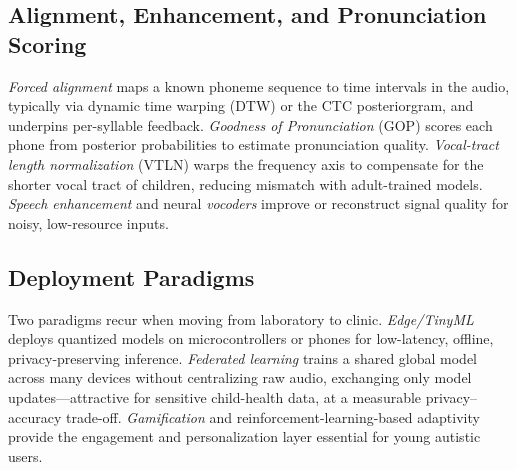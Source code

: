 \documentclass[conference]{IEEEtran}
\begin{document}
\subsection{Alignment, Enhancement, and Pronunciation Scoring}
\emph{Forced alignment} maps a known phoneme sequence to time intervals in the audio, typically via dynamic time warping (DTW) or the CTC posteriorgram, and underpins per-syllable feedback. \emph{Goodness of Pronunciation} (GOP) scores each phone from posterior probabilities to estimate pronunciation quality. \emph{Vocal-tract length normalization} (VTLN) warps the frequency axis to compensate for the shorter vocal tract of children, reducing mismatch with adult-trained models. \emph{Speech enhancement} and neural \emph{vocoders} improve or reconstruct signal quality for noisy, low-resource inputs.

\subsection{Deployment Paradigms}
Two paradigms recur when moving from laboratory to clinic. \emph{Edge/TinyML} deploys quantized models on microcontrollers or phones for low-latency, offline, privacy-preserving inference. \emph{Federated learning} trains a shared global model across many devices without centralizing raw audio, exchanging only model updates---attractive for sensitive child-health data, at a measurable privacy--accuracy trade-off. \emph{Gamification} and reinforcement-learning-based adaptivity provide the engagement and personalization layer essential for young autistic users.

\end{document}
